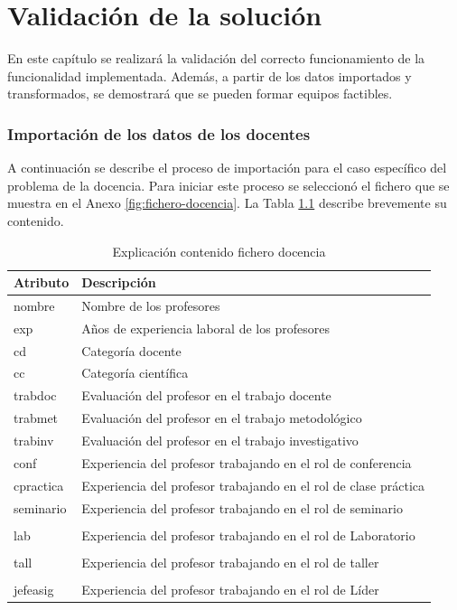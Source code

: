 \chapter{Validación de la solución}\label{chap:3}

En este capítulo se realizará la validación del correcto funcionamiento de la funcionalidad implementada. Además, a partir de los datos importados y transformados, se demostrará que se pueden formar equipos factibles.

\subsection{Importación de los datos de los docentes}\label{sec:impo_docencia}
A continuación se describe el proceso de importación para el caso específico del problema de la docencia. Para iniciar este proceso se seleccionó el fichero que se muestra en el Anexo \ref{fig:fichero-docencia}. La Tabla \ref{table:importar-fichero-docencia} describe brevemente su contenido.\\

\begin{table}
	\centering
	\caption{Explicación contenido fichero docencia}\label{table:importar-fichero-docencia}
	\begin{tabular} {l | p{10cm}}
		\toprule
		\textbf{Atributo} & \textbf{Descripción} \\ \midrule
		nombre & Nombre de los profesores \\ \hline
		exp & Años de experiencia laboral de los profesores \\ \hline
		cd & Categoría docente \\ \hline
		cc & Categoría científica \\ \hline
		trabdoc & Evaluación del profesor en el trabajo docente \\ \hline
		trabmet & Evaluación del profesor en el trabajo metodológico\\ \hline
		trabinv & Evaluación del profesor en el trabajo investigativo\\ \hline
		conf & Experiencia del profesor trabajando en el rol de conferencia\\ \hline
		cpractica & Experiencia del profesor trabajando en el rol de clase práctica \\ \hline
		seminario & Experiencia del profesor trabajando en el rol de seminario\\ \hline\\
		lab & Experiencia del profesor trabajando en el rol de Laboratorio\\ \hline\\
		tall & Experiencia del profesor trabajando en el rol de taller \\ \hline\\
		jefeasig & Experiencia del profesor trabajando en el rol de Líder\\ \bottomrule
	\end{tabular}
\end{table}


